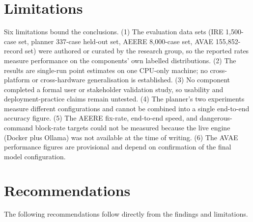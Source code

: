 \section{Limitations}\label{sec:conclusions-limitations}

Six limitations bound the conclusions. (1) The evaluation data sets (IRE
1,500-case set, planner 337-case held-out set, AEERE 8,000-case set, AVAE
155,852-record set) were authored or curated by the research group, so the
reported rates measure performance on the components' own labelled
distributions. (2) The results are single-run point estimates on one CPU-only
machine; no cross-platform or cross-hardware generalisation is established.
(3) No component completed a formal user or stakeholder validation study, so
usability and deployment-practice claims remain untested. (4) The planner's two
experiments measure different configurations and cannot be combined into a
single end-to-end accuracy figure. (5) The AEERE fix-rate, end-to-end speed, and
dangerous-command block-rate targets could not be measured because the live
engine (Docker plus Ollama) was not available at the time of writing. (6) The
AVAE performance figures are provisional and depend on confirmation of the final
model configuration.

\section{Recommendations}\label{sec:conclusions-recommendations}

The following recommendations follow directly from the findings and
limitations.

